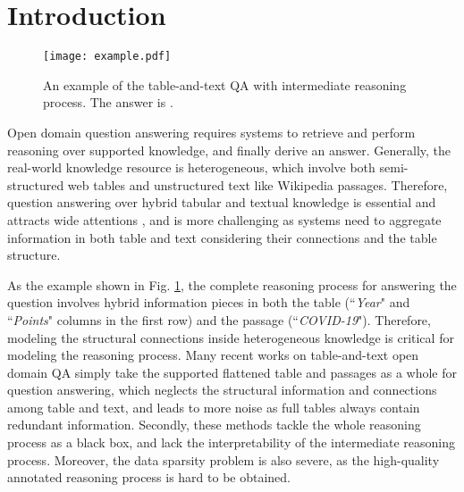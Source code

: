 \documentclass[11pt]{article}
\begin{document}
\section{Introduction}
	\begin{figure}[t]
	\vspace{3mm}
		\centering
		\texttt{[image: example.pdf]}
		\caption{An example of the table-and-text QA with intermediate reasoning process. The answer is .}
		\label{fig:example}
	\vspace{-3mm}
	\end{figure}
	Open domain question answering \cite{joshi2017triviaqa,dunn2017searchqa,nqopen} requires systems to retrieve and perform reasoning over supported knowledge, and finally derive an answer. 
Generally, the real-world knowledge resource is heterogeneous, which involve both semi-structured web tables and unstructured text like Wikipedia passages.
Therefore, question answering over hybrid tabular and textual knowledge is essential and attracts wide attentions \cite{chen2020open}, and is more challenging as systems need to aggregate information in both table and text considering their connections and the table structure.  
	
	As the example shown in Fig. \ref{fig:example}, the complete reasoning process for answering the question involves hybrid information pieces in both the table (``\textit{Year}" and ``\textit{Points}" columns in the first row) and the passage (``\textit{COVID-19}"). 
	Therefore, modeling the structural connections inside heterogeneous knowledge is critical for modeling the reasoning process. 
	Many recent works on table-and-text open domain QA simply take the supported flattened table and passages \cite{chen2020open,li2021dual} as a whole for question answering, which neglects the structural information and connections among table and text, and leads to more noise as full tables always contain redundant information. 
Secondly, these methods tackle the whole reasoning process as a black box, and lack the interpretability of the intermediate reasoning process. 
	Moreover, the data sparsity problem is also severe, as the high-quality annotated reasoning process is hard to be obtained.
\end{document}
